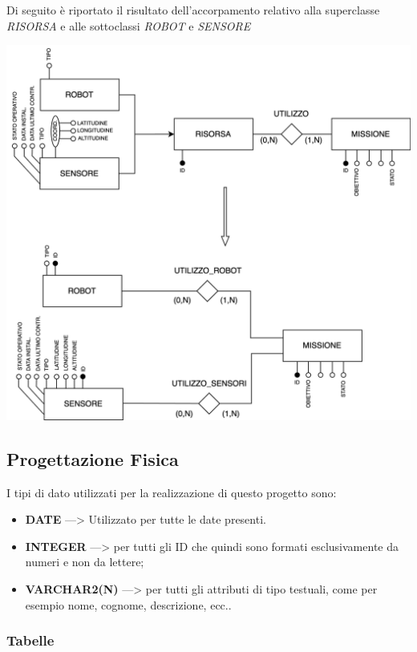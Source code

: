 \documentclass{article}
\begin{document}
Di seguito è riportato il risultato dell'accorpamento relativo alla superclasse \textit{RISORSA} e alle sottoclassi \textit{ROBOT} e \textit{SENSORE}

\includegraphics[width=\textwidth]{Media/Generalizzazione_Specializzazione.png}

\subsection{Progettazione Fisica}

I tipi di dato utilizzati per la realizzazione di questo progetto sono:

\begin{itemize}
    \item \textbf{DATE} —> Utilizzato per tutte le date presenti.
    \item \textbf{INTEGER} —> per tutti gli ID che quindi sono formati esclusivamente da numeri e non da lettere;
    \item \textbf{VARCHAR2(N)} —> per tutti gli attributi di tipo testuali, come per esempio nome, cognome, descrizione, ecc..
\end{itemize}

\subsubsection{Tabelle}
\end{document}
